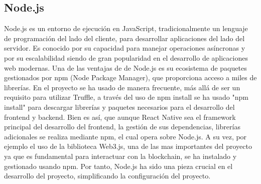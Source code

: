 \subsection{Node.js}

Node.js es un entorno de ejecución en JavaScript, tradicionalmente un lenguaje de programación del lado del cliente, para desarrollar aplicaciones del lado del servidor. Es conocido por su capacidad para manejar operaciones asíncronas y por su escalabilidad siendo de gran popularidad en el desarrollo de aplicaciones web modernas. Una de las ventajas de de Node.js es su ecosistema de paquetes gestionados por npm (Node Package Manager), que proporciona acceso a miles de librerías.
En el proyecto se ha usado de manera frecuente, más allá de ser un requisito para utilizar Truffle, a través del uso de npm install se ha usado "npm install" para descargar librerías y paquetes necesarios para el desarrollo del frontend y backend.
Bien es así, que aunque React Native sea el framework principal del desarrollo del frontend, la gestión de sus dependencias, librerías adicionales se realiza mediante npm, el cual opera sobre Node.js.
A su vez, por ejemplo el uso de la biblioteca Web3.js, una de las mas importantes del proyecto ya que es fundamental para interactuar con la blockchain, se ha instalado y gestionado usando npm.
Por tanto, Node.js ha sido una pieza crucial en el desarrollo del proyecto, simplificando la configuración del proyecto.